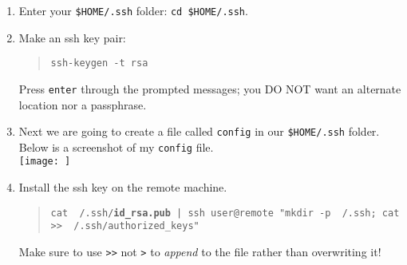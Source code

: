 \documentclass{article}
\begin{document}
\begin{enumerate}
\item Enter your \texttt{\$HOME/.ssh} folder: \texttt{cd \$HOME/.ssh}. 
\item Make an ssh key pair:
    \begin{quote}
        \texttt{ssh-keygen -t rsa}
    \end{quote}
    Press \texttt{enter} through the prompted messages; you DO NOT want an alternate location nor a passphrase.

\item Next we are going to create a file called \texttt{config} in our \texttt{\$HOME/.ssh} folder. Below is a screenshot of my \texttt{config}
      file. \\
        \texttt{[image: ]}


\item Install the ssh key on the remote machine.
    \begin{quote}
        \texttt{cat ~/.ssh/\textbf{id\_rsa.pub} | ssh user@remote "mkdir -p ~/.ssh; cat >> ~/.ssh/authorized\_keys"}
    \end{quote}
        Make sure to use \texttt{>>} not \texttt{>} to \textit{append} to the file rather than overwriting it! 
\end{enumerate}
\end{document}
